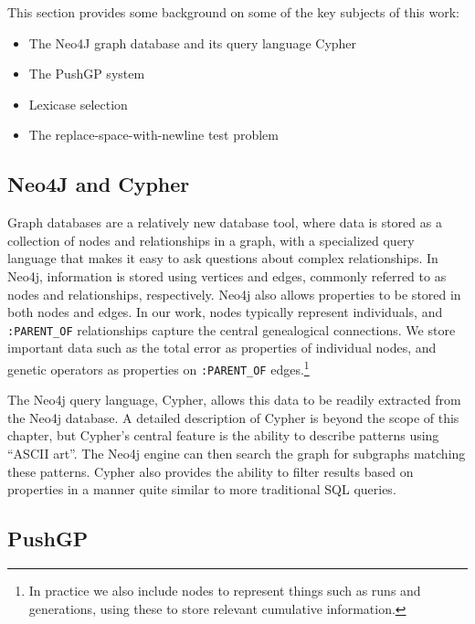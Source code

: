 This section provides some background on some of the key subjects of this work:
\begin{itemize}
	\item The Neo4J graph database and its query language Cypher
	\item The PushGP system
	\item Lexicase selection
	\item The replace-space-with-newline test problem
\end{itemize} 

\subsection{Neo4J and Cypher}
\label{subsec:Neo4j}

Graph databases \citep{Robinson:GraphDB:Book} are a relatively new database tool, where data is stored 
as a collection of nodes and relationships in a graph, with a specialized query language that makes 
it easy to ask questions about complex relationships. In Neo4j, information is stored using
vertices and edges, commonly referred to as nodes and relationships, 
respectively. Neo4j also allows properties to be stored in both nodes and edges.
In our work, nodes typically represent individuals, and \texttt{:PARENT\_OF} relationships 
capture the central genealogical connections. We store important data such as the total error as
properties of individual nodes, and genetic operators as properties on 
\texttt{:PARENT\_OF} edges.\footnote{In practice we also include nodes to represent things
	such as runs and generations, using these to store relevant cumulative information.}

The Neo4j query language, Cypher, allows this data to be readily extracted from the Neo4j database.
A detailed description of Cypher is beyond the scope of this chapter, but Cypher's central feature is
the ability to describe patterns using ``ASCII art''. The Neo4j engine can then search
the graph for subgraphs matching these patterns. Cypher also provides the ability to 
filter results based on properties in a manner quite similar to more traditional SQL queries.

\subsection{PushGP}

